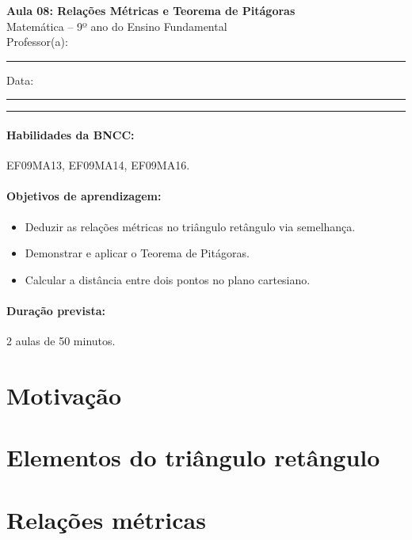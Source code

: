 \documentclass[11pt,a4paper]{article}
\newcommand{\numaula}{08}
\newcommand{\tituloaula}{Relações Métricas e Teorema de Pitágoras}
\begin{document}
\begin{center}
  {\Large\bfseries Aula \numaula: \tituloaula}\\[4pt]
  {\large Matemática -- 9º ano do Ensino Fundamental}\\[2pt]
  Professor(a): \rule{6cm}{0.4pt} \qquad Data: \rule{3cm}{0.4pt}
\end{center}
\noindent\rule{\linewidth}{0.8pt}

\paragraph{Habilidades da BNCC:} EF09MA13, EF09MA14, EF09MA16.

\paragraph{Objetivos de aprendizagem:}
\begin{itemize}[nosep]
  \item Deduzir as relações métricas no triângulo retângulo via semelhança.
  \item Demonstrar e aplicar o Teorema de Pitágoras.
  \item Calcular a distância entre dois pontos no plano cartesiano.
\end{itemize}

\paragraph{Duração prevista:} 2 aulas de 50 minutos. %

\section{Motivação}

\section{Elementos do triângulo retângulo}

\section{Relações métricas}
\end{document}
